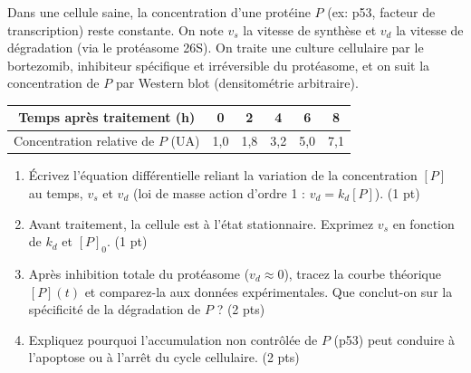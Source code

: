 \documentclass[11pt]{article}
\begin{document}
\begin{exercice}
Dans une cellule saine, la concentration d'une protéine $P$ (ex: p53, facteur de transcription) reste constante. On note $v_s$ la vitesse de synthèse et $v_d$ la vitesse de dégradation (via le protéasome 26S). On traite une culture cellulaire par le bortezomib, inhibiteur spécifique et irréversible du protéasome, et on suit la concentration de $P$ par Western blot (densitométrie arbitraire).

\begin{center}
\begin{tabular}{|c|c|c|c|c|c|}
\hline
Temps après traitement (h) & 0 & 2 & 4 & 6 & 8 \\
\hline
Concentration relative de $P$ (UA) & 1,0 & 1,8 & 3,2 & 5,0 & 7,1 \\
\hline
\end{tabular}
\end{center}

\begin{enumerate}
    \item Écrivez l'équation différentielle reliant la variation de la concentration $[P]$ au temps, $v_s$ et $v_d$ (loi de masse action d'ordre 1 : $v_d = k_d[P]$). (1 pt)
    \item Avant traitement, la cellule est à l'état stationnaire. Exprimez $v_s$ en fonction de $k_d$ et $[P]_0$. (1 pt)
    \item Après inhibition totale du protéasome ($v_d \approx 0$), tracez la courbe théorique $[P](t)$ et comparez-la aux données expérimentales. Que conclut-on sur la spécificité de la dégradation de $P$ ? (2 pts)
    \item Expliquez pourquoi l'accumulation non contrôlée de $P$ (p53) peut conduire à l'apoptose ou à l'arrêt du cycle cellulaire. (2 pts)
\end{enumerate}
\end{exercice}
\end{document}
